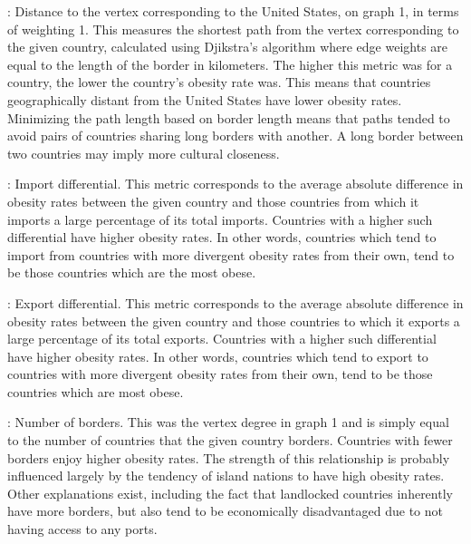 \documentclass[oneside,12pt]{report}
\begin{document}
: Distance to the vertex corresponding to the United States, on graph 1, in terms of weighting 1. This measures the shortest path from the vertex corresponding to the given country, calculated using Djikstra's algorithm where edge weights are equal to the length of the border in kilometers. The higher this metric was for a country, the lower the country's obesity rate was. This means that countries geographically distant from the United States have lower obesity rates. Minimizing the path length based on border length means that paths tended to avoid pairs of countries sharing long borders with another. A long border between two countries may imply more cultural closeness.
\vspace{5pt}

: Import differential. This metric corresponds to the average absolute difference in obesity rates between the given country and those countries from which it imports a large percentage of its total imports. Countries with a higher such differential have higher obesity rates. In other words, countries which tend to import from countries with more divergent obesity rates from their own, tend to be those countries which are the most obese.
\vspace{5pt}

: Export differential. This metric corresponds to the average absolute difference in obesity rates between the given country and those countries to which it exports a large percentage of its total exports. Countries with a higher such differential have higher obesity rates. In other words, countries which tend to export to countries with more divergent obesity rates from their own, tend to be those countries which are most obese.
\vspace{5pt}

: Number of borders. This was the vertex degree in graph 1 and is simply equal to the number of countries that the given country borders. Countries with fewer borders enjoy higher obesity rates. The strength of this relationship is probably influenced largely by the tendency of island nations to have high obesity rates. Other explanations exist, including the fact that landlocked countries inherently have more borders, but also tend to be economically disadvantaged due to not having access to any ports.
\vspace{5pt}
\end{document}
